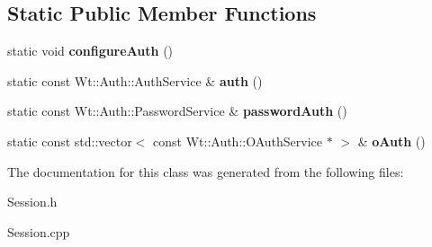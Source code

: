 \subsection*{Static Public Member Functions}
\begin{DoxyCompactItemize}
\item 
\mbox{\label{class_session_a02ee7e0bfcaf6470f35661ec30b8cf8b}} 
static void {\bfseries configure\+Auth} ()
\item 
\mbox{\label{class_session_ab88e346fdd2ca6c3652f612555babf49}} 
static const Wt\+::\+Auth\+::\+Auth\+Service \& {\bfseries auth} ()
\item 
\mbox{\label{class_session_a4eede16df1d6ca2fe229db43783c8398}} 
static const Wt\+::\+Auth\+::\+Password\+Service \& {\bfseries password\+Auth} ()
\item 
\mbox{\label{class_session_a1377ccd4db82206d247901fa522bfd8a}} 
static const std\+::vector$<$ const Wt\+::\+Auth\+::\+O\+Auth\+Service $\ast$ $>$ \& {\bfseries o\+Auth} ()
\end{DoxyCompactItemize}


The documentation for this class was generated from the following files\+:\begin{DoxyCompactItemize}
\item 
Session.\+h\item 
Session.\+cpp\end{DoxyCompactItemize}

